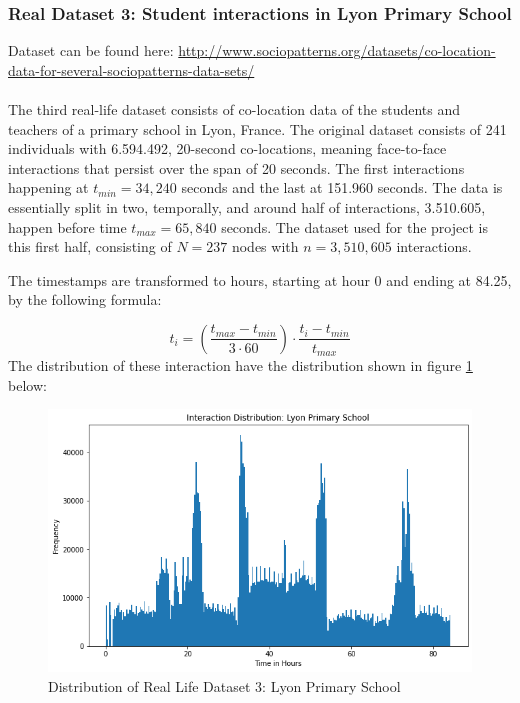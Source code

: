 \subsubsection{Real Dataset 3: Student interactions in Lyon Primary School}
\label{sec:Data:RealData:RealDataset3}
Dataset can be found here: \href{http://www.sociopatterns.org/datasets/co-location-data-for-several-sociopatterns-data-sets/}{http://www.sociopatterns.org/datasets/co-location-data-for-several-sociopatterns-data-sets/}
\\\\
The third real-life dataset consists of co-location data of the students and teachers of a primary school in Lyon, France.
The original dataset consists of 241 individuals with 6.594.492, 20-second co-locations, meaning face-to-face interactions that persist over the span of 20 seconds.
The first interactions happening at $t_{min} = 34,240$ seconds and the last at 151.960 seconds.
The data is essentially split in two, temporally, and around half of interactions, 3.510.605, happen before time $t_{max} = 65,840$ seconds.
The dataset used for the project is this first half, consisting of $N = 237$ nodes with $n = 3,510,605$ interactions.

The timestamps are transformed to hours, starting at hour 0 and ending at 84.25, by the following formula:

\begin{equation}
    t_i = \left(\frac{t_{max} - t_{min}}{3 \cdot 60} \right) \cdot \frac{t_i - t_{min}}{t_{max}}
\end{equation}
The distribution of these interaction have the distribution shown in figure \ref{fig:RLdataset3} below:

\begin{figure}[H]
    \centering
    \includegraphics[width=\textwidth]{0_images/real_dataset_3_dist.png}
    \caption{Distribution of Real Life Dataset 3: Lyon Primary School}
    \label{fig:RLdataset3}
\end{figure}







